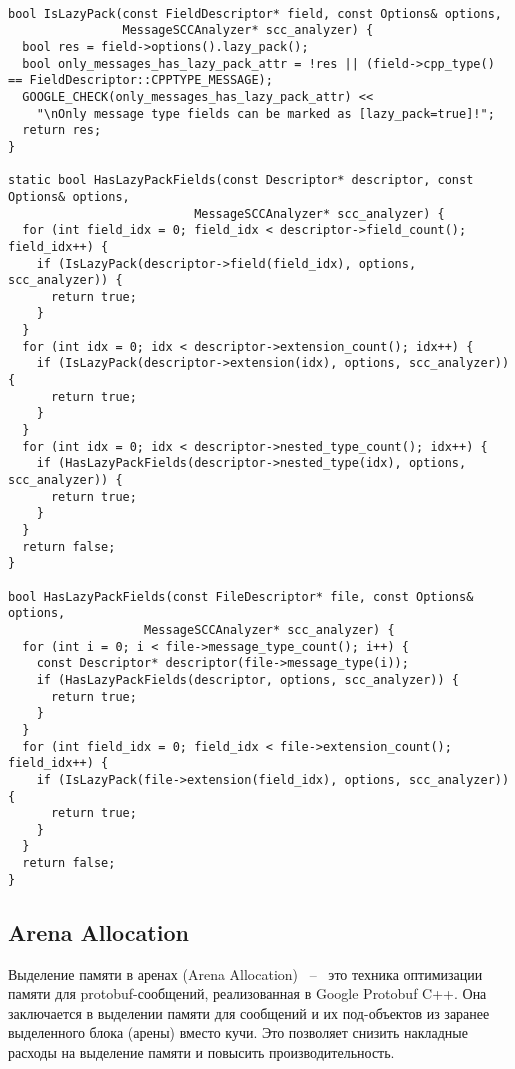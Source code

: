 \begin{lstlisting}[style=CodeListing, label=sec_impl:code:is_lazy_pack, caption={Вспомогательные методы для определения опции lazy\_pack}]

bool IsLazyPack(const FieldDescriptor* field, const Options& options,
                MessageSCCAnalyzer* scc_analyzer) {
  bool res = field->options().lazy_pack();
  bool only_messages_has_lazy_pack_attr = !res || (field->cpp_type() == FieldDescriptor::CPPTYPE_MESSAGE); 
  GOOGLE_CHECK(only_messages_has_lazy_pack_attr) << 
    "\nOnly message type fields can be marked as [lazy_pack=true]!";
  return res;
}

static bool HasLazyPackFields(const Descriptor* descriptor, const Options& options,
                          MessageSCCAnalyzer* scc_analyzer) {
  for (int field_idx = 0; field_idx < descriptor->field_count(); field_idx++) {
    if (IsLazyPack(descriptor->field(field_idx), options, scc_analyzer)) {
      return true;
    }
  }
  for (int idx = 0; idx < descriptor->extension_count(); idx++) {
    if (IsLazyPack(descriptor->extension(idx), options, scc_analyzer)) {
      return true;
    }
  }
  for (int idx = 0; idx < descriptor->nested_type_count(); idx++) {
    if (HasLazyPackFields(descriptor->nested_type(idx), options, scc_analyzer)) {
      return true;
    }
  }
  return false;
}

bool HasLazyPackFields(const FileDescriptor* file, const Options& options,
                   MessageSCCAnalyzer* scc_analyzer) {
  for (int i = 0; i < file->message_type_count(); i++) {
    const Descriptor* descriptor(file->message_type(i));
    if (HasLazyPackFields(descriptor, options, scc_analyzer)) {
      return true;
    }
  }
  for (int field_idx = 0; field_idx < file->extension_count(); field_idx++) {
    if (IsLazyPack(file->extension(field_idx), options, scc_analyzer)) {
      return true;
    }
  }
  return false;
}

\end{lstlisting}

\subsection{Arena Allocation}

Выделение памяти в аренах (Arena Allocation) ~--~ это техника оптимизации памяти для protobuf-сообщений, реализованная в Google Protobuf C++. 
Она заключается в выделении памяти для сообщений и их под-объектов из заранее выделенного блока (арены) вместо кучи.
Это позволяет снизить накладные расходы на выделение памяти и повысить производительность.

